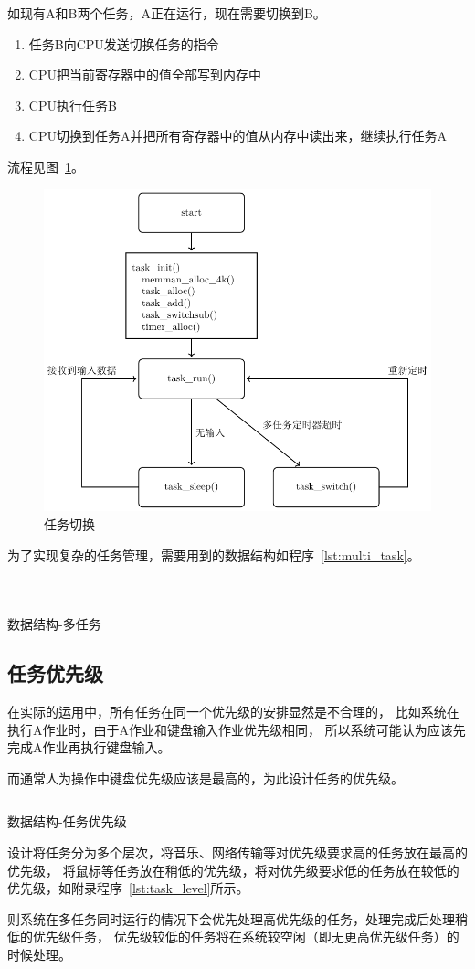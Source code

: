 如现有A和B两个任务，A正在运行，现在需要切换到B。
\begin{enumerate}
\item 任务B向CPU发送切换任务的指令
\item CPU把当前寄存器中的值全部写到内存中
\item CPU执行任务B
\item CPU切换到任务A并把所有寄存器中的值从内存中读出来，继续执行任务A
\end{enumerate}
流程见图~\ref{fig:tasksw}。
\begin{figure}[H]
  \centering
  \includegraphics[width=.7\textwidth]{../Fig/func/multi.pdf}
  \caption{任务切换}
  \label{fig:tasksw}
\end{figure}

为了实现复杂的任务管理，需要用到的数据结构如程序~\ref{lst:multi_task}。
\begin{listing}[H]
  \inputminted[tabsize=2, firstline=227, lastline=232,
    linenos=true]{c}{../ZOS/src/kernel/bootpack.h}
  \inputminted[tabsize=2, firstline=222, lastline=226,
    linenos=true]{c}{../ZOS/src/kernel/bootpack.h}
  \inputminted[tabsize=2, firstline=209, lastline=221,
    linenos=true]{c}{../ZOS/src/kernel/bootpack.h}
  \caption{数据结构-多任务}
  \label{lst:multi_task}
\end{listing}

\subsection{任务优先级}

在实际的运用中，所有任务在同一个优先级的安排显然是不合理的，
比如系统在执行A作业时，由于A作业和键盘输入作业优先级相同，
所以系统可能认为应该先完成A作业再执行键盘输入。

而通常人为操作中键盘优先级应该是最高的，为此设计任务的优先级。

\begin{listing}[H]
  \inputminted[tabsize=2, firstline=222, lastline=226,
    linenos=true]{c}{../ZOS/src/kernel/bootpack.h}
  \caption{数据结构-任务优先级}
  \label{lst:task_level}
\end{listing}

设计将任务分为多个层次，将音乐、网络传输等对优先级要求高的任务放在最高的优先级，
将鼠标等任务放在稍低的优先级，将对优先级要求低的任务放在较低的优先级，如附录程序~\ref{lst:task_level}所示。

则系统在多任务同时运行的情况下会优先处理高优先级的任务，处理完成后处理稍低的优先级任务，
优先级较低的任务将在系统较空闲（即无更高优先级任务）的时候处理。